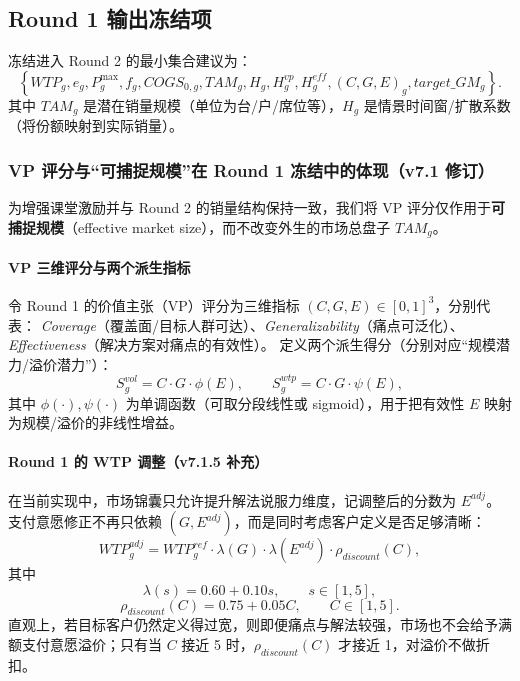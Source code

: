 \documentclass[UTF8,12pt]{ctexart}
\begin{document}
\subsection{Round 1 输出冻结项}
冻结进入 Round 2 的最小集合建议为：
\[
\left\{WTP_g, e_g, P^{\max}_g, f_g, COGS_{0,g}, TAM_g, H_g, H^{vp}_g, H^{eff}_g, (C,G,E)_g,target\_GM_g\right\}.
\]
其中 $TAM_g$ 是潜在销量规模（单位为台/户/席位等），$H_g$ 是情景时间窗/扩散系数（将份额映射到实际销量）。

\subsubsection{VP 评分与“可捕捉规模”在 Round 1 冻结中的体现（v7.1 修订）}
为增强课堂激励并与 Round 2 的销量结构保持一致，我们将 VP 评分仅作用于\textbf{可捕捉规模}（effective market size），而不改变外生的市场总盘子 $TAM_g$。

\paragraph{VP 三维评分与两个派生指标}
令 Round 1 的价值主张（VP）评分为三维指标 $(C,G,E)\in[0,1]^3$，分别代表：
\emph{Coverage}（覆盖面/目标人群可达）、\emph{Generalizability}（痛点可泛化）、\emph{Effectiveness}（解决方案对痛点的有效性）。
定义两个派生得分（分别对应“规模潜力/溢价潜力”）：
\begin{equation}
S^{vol}_g = C\cdot G\cdot \phi(E),\qquad
S^{wtp}_g = C\cdot G\cdot \psi(E),
\label{eq:vp_scores}
\end{equation}
其中 $\phi(\cdot),\psi(\cdot)$ 为单调函数（可取分段线性或 sigmoid），用于把有效性 $E$ 映射为规模/溢价的非线性增益。

\paragraph{Round 1 的 WTP 调整（v7.1.5 补充）}
在当前实现中，市场锦囊只允许提升解法说服力维度，记调整后的分数为 $E^{adj}$。支付意愿修正不再只依赖 $(G,E^{adj})$，而是同时考虑客户定义是否足够清晰：
\begin{equation}
WTP^{adj}_g = WTP^{ref}_g \cdot \lambda(G)\cdot \lambda(E^{adj})\cdot \rho_{discount}(C),
\label{eq:wtp_adj_round1}
\end{equation}
其中
\begin{equation}
\lambda(s)=0.60+0.10s,\qquad s\in[1,5],
\end{equation}
\begin{equation}
\rho_{discount}(C)=0.75+0.05C,\qquad C\in[1,5].
\end{equation}
直观上，若目标客户仍然定义得过宽，则即便痛点与解法较强，市场也不会给予满额支付意愿溢价；只有当 $C$ 接近 5 时，$\rho_{discount}(C)$ 才接近 1，对溢价不做折扣。
\end{document}
